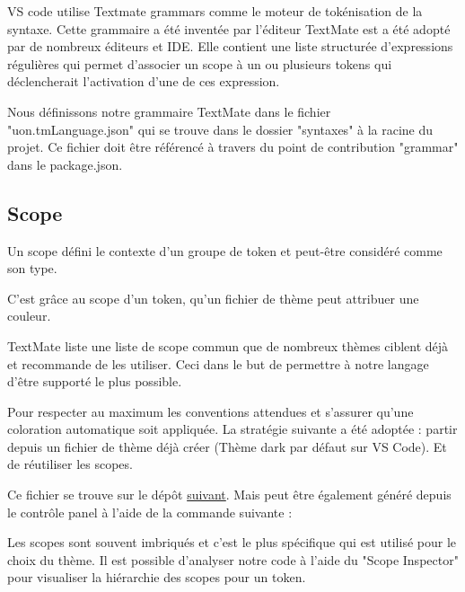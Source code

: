 \documentclass[
    iict, %
    il, %
]{heig-tb}
\begin{document}
VS code utilise Textmate grammars \cite{textmate-grammars} comme le moteur de tokénisation de la syntaxe.
Cette grammaire a été inventée par l'éditeur TextMate est a été adopté par de nombreux éditeurs et IDE.
Elle contient une liste structurée d'expressions régulières qui permet d'associer un scope
à un ou plusieurs tokens qui déclencherait l'activation d'une de ces expression.


Nous définissons notre grammaire TextMate dans le fichier "uon.tmLanguage.json" qui se trouve dans le dossier "syntaxes" à la racine du projet.
Ce fichier doit être référencé à travers du point de contribution "grammar" dans le package.json.


\subsection{Scope}
Un scope défini le contexte d'un groupe de token et peut-être considéré comme son type.

C'est grâce au scope d'un token, qu'un fichier de thème peut attribuer une couleur.

TextMate liste une liste de scope commun que de nombreux thèmes ciblent déjà et recommande de les utiliser.
Ceci dans le but de permettre à notre langage d'être supporté le plus possible.

Pour respecter au maximum les conventions attendues et s'assurer qu'une coloration automatique soit appliquée. La stratégie suivante a été adoptée : partir depuis un fichier de thème déjà créer (Thème dark par défaut sur VS Code). Et de réutiliser les scopes.

Ce fichier se trouve sur le dépôt \href{https://github.com/microsoft/vscode/blob/main/extensions/theme-defaults/themes/dark_vs.json}{suivant}.
Mais peut être également généré depuis le contrôle panel à l'aide de la commande suivante : %


Les scopes sont souvent imbriqués et c'est le plus spécifique qui est utilisé pour le choix du thème.
Il est possible d'analyser notre code à l'aide du "Scope Inspector" pour visualiser la hiérarchie des scopes pour un token.
\end{document}
